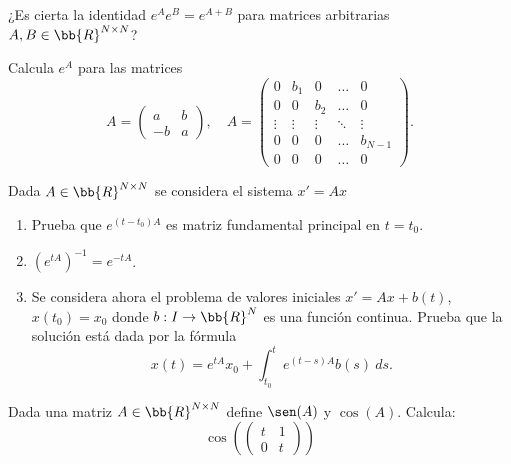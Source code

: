 \begin{ejercicio}\label{ej:5.13}
    ¿Es cierta la identidad $e^Ae^B = e^{A+B}$ para matrices arbitrarias $A, B \in \bb{R}^{N\times N}$?
\end{ejercicio}

\begin{ejercicio}\label{ej:5.14}
    Calcula $e^A$ para las matrices
    \[
        A =
        \begin{pmatrix}
            a & b\\
            -b & a
        \end{pmatrix},
        \quad
        A =
        \begin{pmatrix}
            0 & b_1 & 0 & \ldots & 0\\
            0 & 0 & b_2 & \ldots & 0\\
            \vdots & \vdots & \vdots & \ddots & \vdots\\
            0 & 0 & 0 & \ldots & b_{N-1}\\
            0 & 0 & 0 & \ldots & 0
        \end{pmatrix}.
    \]
\end{ejercicio}

\begin{ejercicio}\label{ej:5.15}
    Dada $A \in \bb{R}^{N\times N}$ se considera el sistema $x' = Ax$
    \begin{enumerate}
        \item Prueba que $e^{(t-t_0)A}$ es matriz fundamental principal en $t = t_0$.
        \item $(e^{tA})^{-1} = e^{-tA}$.
        \item Se considera ahora el problema de valores iniciales $x' = Ax+b(t)$, $x(t_0) = x_0$ donde $b : I \to \bb{R}^N$ es una función continua. Prueba que la solución está dada por la fórmula
        \[
            x(t) = e^{tA}x_0 + \int_{t_0}^t e^{(t-s)A}b(s)~ds.
        \]
    \end{enumerate}
\end{ejercicio}

\begin{ejercicio}\label{ej:5.16}
    Dada una matriz $A \in \bb{R}^{N\times N}$ define $\sen(A)$ y $\cos(A)$. Calcula: $$\cos\left(\begin{pmatrix} t & 1\\ 0 & t \end{pmatrix}\right)$$
\end{ejercicio}



